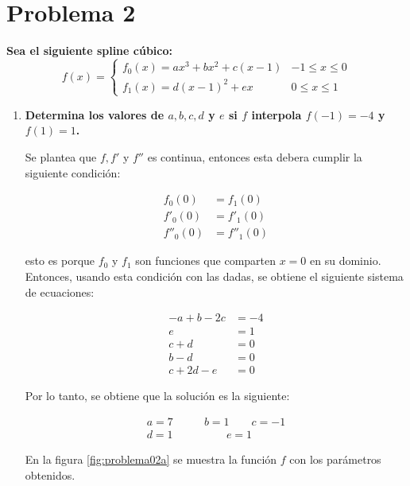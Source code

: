 \section*{Problema 2}
\textbf{Sea el siguiente spline cúbico:}
\begin{equation*}
	f(x) = \begin{cases}
		f_0(x)= ax^3+bx^2+c(x-1) & -1\leq x \leq 0 \\
		f_1(x) = d(x-1)^2 +ex    & 0\leq x \leq 1
	\end{cases}
\end{equation*}
\begin{enumerate}
	\item \textbf{Determina los valores de $a,b,c,d$ y $e$ si $f$ interpola $f(-1)=-4$ y $f(1)=1$.}

	      Se plantea que $f,f'$ y $f''$ es continua, entonces esta debera cumplir la siguiente condición:

	      \begin{align*}
		      f_0(0)   & = f_1(0)   \\
		      f'_0(0)  & = f'_1(0)  \\
		      f''_0(0) & = f''_1(0)
	      \end{align*}

	      esto es porque $f_0$ y $f_1$  son funciones que comparten $x=0$ en su dominio. Entonces, usando esta condición con las dadas, se obtiene el siguiente sistema de ecuaciones:

	      \begin{align*}
		      -a+b-2c & = -4 \\
		      e       & = 1  \\
		      c+d     & = 0  \\
		      b-d     & =0   \\
		      c+2d-e  & = 0
	      \end{align*}

	      Por lo tanto, se obtiene que la solución es la siguiente:

	      \begin{align*}
		      a = 7 \qquad & b = 1 \qquad c= -1 \\
		      d = 1        & \qquad e=1
	      \end{align*}

	      En la figura \ref{fig:problema02a} se muestra la función $f$ con los parámetros obtenidos.


\end{enumerate}

